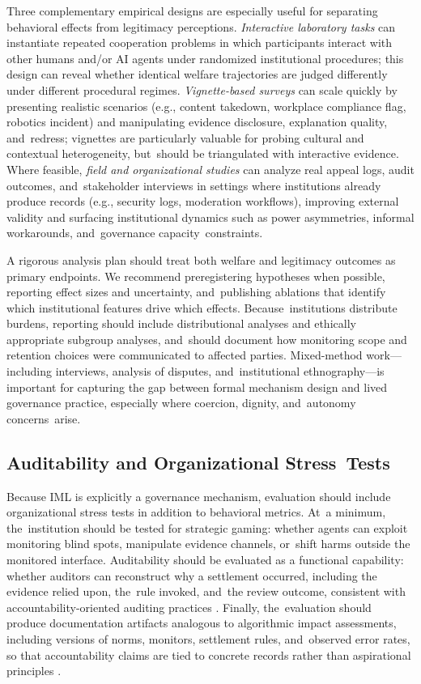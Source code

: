 \documentclass[mca,article,accept,pdftex,oneauthor]{Definitions/mdpi}
\begin{document}
Three complementary empirical designs are especially useful for separating behavioral effects from legitimacy perceptions. \emph{Interactive laboratory tasks} can instantiate repeated cooperation problems in which participants interact with other humans and/or AI agents under randomized institutional procedures; this design can reveal whether identical welfare trajectories are judged differently under different procedural regimes. \emph{Vignette-based surveys} can scale quickly by presenting realistic scenarios (e.g., content takedown, workplace compliance flag, robotics incident) and manipulating evidence disclosure, explanation quality, and~redress; vignettes are particularly valuable for probing cultural and contextual heterogeneity, but~should be triangulated with interactive evidence. Where feasible, \emph{field and organizational studies} can analyze real appeal logs, audit outcomes, and~stakeholder interviews in settings where institutions already produce records (e.g., security logs, moderation workflows), improving external validity and surfacing institutional dynamics such as power asymmetries, informal workarounds, and~governance capacity~constraints.

A rigorous analysis plan should treat both welfare and legitimacy outcomes as primary endpoints. We recommend preregistering hypotheses when possible, reporting effect sizes and uncertainty, and~publishing ablations that identify which institutional features drive which effects. Because~institutions distribute burdens, reporting should include distributional analyses and ethically appropriate subgroup analyses, and~should document how monitoring scope and retention choices were communicated to affected parties. Mixed-method work---including interviews, analysis of disputes, and~institutional ethnography---is important for capturing the gap between formal mechanism design and lived governance practice, especially where coercion, dignity, and~autonomy concerns~arise.

\subsection{Auditability and Organizational Stress~Tests}
\label{sec:audits}

Because IML is explicitly a governance mechanism, evaluation should include organizational stress tests in addition to behavioral metrics. At~a minimum, the~institution should be tested for strategic gaming: whether agents can exploit monitoring blind spots, manipulate evidence channels, or~shift harms outside the monitored interface. Auditability should be evaluated as a functional capability: whether auditors can reconstruct why a settlement occurred, including the evidence relied upon, the~rule invoked, and~the review outcome, consistent with accountability-oriented auditing practices \citep{Raji2020Auditing,Kroll2017AccountableAlgorithms}. Finally, the~evaluation should produce documentation artifacts analogous to algorithmic impact assessments, including versions of norms, monitors, settlement rules, and~observed error rates, so that accountability claims are tied to concrete records rather than aspirational principles \citep{Metcalf2021AIA,Selbst2021AIA}.
\end{document}
